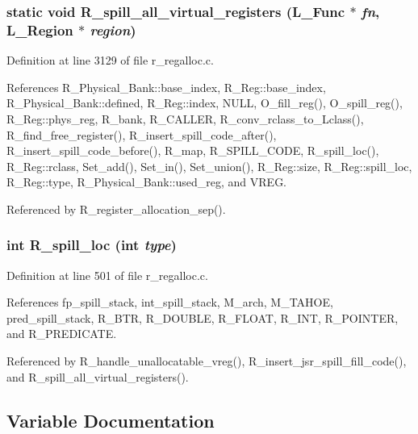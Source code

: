\subsubsection{\setlength{\rightskip}{0pt plus 5cm}static void R\_\-spill\_\-all\_\-virtual\_\-registers (L\_\-Func $\ast$ {\em fn}, L\_\-Region $\ast$ {\em region})\hspace{0.3cm}{\tt  [static]}}\label{r__regalloc_8c_9de1339083808cfe099aa350f367f2ea}




Definition at line 3129 of file r\_\-regalloc.c.

References R\_\-Physical\_\-Bank::base\_\-index, R\_\-Reg::base\_\-index, R\_\-Physical\_\-Bank::defined, R\_\-Reg::index, NULL, O\_\-fill\_\-reg(), O\_\-spill\_\-reg(), R\_\-Reg::phys\_\-reg, R\_\-bank, R\_\-CALLER, R\_\-conv\_\-rclass\_\-to\_\-Lclass(), R\_\-find\_\-free\_\-register(), R\_\-insert\_\-spill\_\-code\_\-after(), R\_\-insert\_\-spill\_\-code\_\-before(), R\_\-map, R\_\-SPILL\_\-CODE, R\_\-spill\_\-loc(), R\_\-Reg::rclass, Set\_\-add(), Set\_\-in(), Set\_\-union(), R\_\-Reg::size, R\_\-Reg::spill\_\-loc, R\_\-Reg::type, R\_\-Physical\_\-Bank::used\_\-reg, and VREG.

Referenced by R\_\-register\_\-allocation\_\-sep().
\subsubsection{\setlength{\rightskip}{0pt plus 5cm}int R\_\-spill\_\-loc (int {\em type})}\label{r__regalloc_8c_bcc7719c977164ae16e65ad0a30d400e}




Definition at line 501 of file r\_\-regalloc.c.

References fp\_\-spill\_\-stack, int\_\-spill\_\-stack, M\_\-arch, M\_\-TAHOE, pred\_\-spill\_\-stack, R\_\-BTR, R\_\-DOUBLE, R\_\-FLOAT, R\_\-INT, R\_\-POINTER, and R\_\-PREDICATE.

Referenced by R\_\-handle\_\-unallocatable\_\-vreg(), R\_\-insert\_\-jsr\_\-spill\_\-fill\_\-code(), and R\_\-spill\_\-all\_\-virtual\_\-registers().

\subsection{Variable Documentation}
